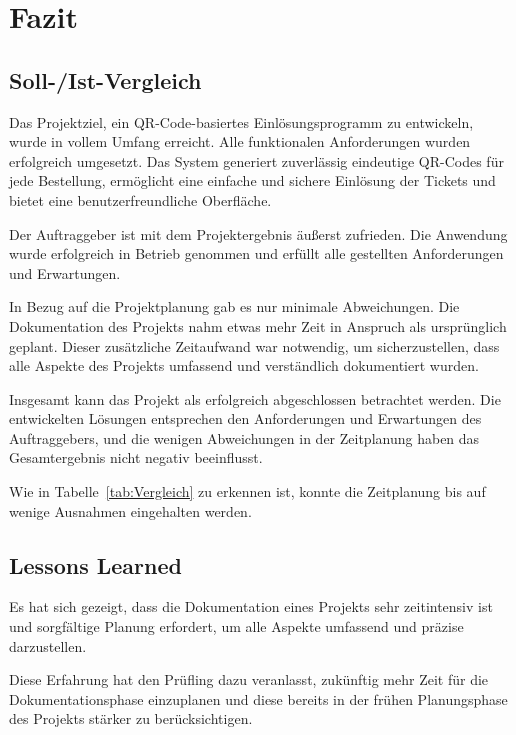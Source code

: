 \section{Fazit} 
\label{sec:Fazit}

\subsection{Soll-/Ist-Vergleich}
\label{sec:SollIstVergleich}

Das Projektziel, ein QR-Code-basiertes Einlösungsprogramm zu entwickeln, wurde in vollem Umfang erreicht. Alle funktionalen Anforderungen wurden erfolgreich umgesetzt. Das System generiert zuverlässig eindeutige QR-Codes für jede Bestellung, ermöglicht eine einfache und sichere Einlösung der Tickets und bietet eine benutzerfreundliche Oberfläche.

Der Auftraggeber ist mit dem Projektergebnis äußerst zufrieden. Die Anwendung wurde erfolgreich in Betrieb genommen und erfüllt alle gestellten Anforderungen und Erwartungen.

In Bezug auf die Projektplanung gab es nur minimale Abweichungen. Die Dokumentation des Projekts nahm etwas mehr Zeit in Anspruch als ursprünglich geplant. Dieser zusätzliche Zeitaufwand war notwendig, um sicherzustellen, dass alle Aspekte des Projekts umfassend und verständlich dokumentiert wurden.

Insgesamt kann das Projekt als erfolgreich abgeschlossen betrachtet werden. Die entwickelten Lösungen entsprechen den Anforderungen und Erwartungen des Auftraggebers, und die wenigen Abweichungen in der Zeitplanung haben das Gesamtergebnis nicht negativ beeinflusst.

Wie in Tabelle~\ref{tab:Vergleich} zu erkennen ist, konnte die Zeitplanung bis auf wenige Ausnahmen eingehalten werden.


\subsection{Lessons Learned}
\label{sec:LessonsLearned}

Es hat sich gezeigt, dass die Dokumentation eines Projekts sehr zeitintensiv ist und sorgfältige Planung erfordert, um alle Aspekte umfassend und präzise darzustellen. 

Diese Erfahrung hat den Prüfling dazu veranlasst, zukünftig mehr Zeit für die Dokumentationsphase einzuplanen und diese bereits in der frühen Planungsphase des Projekts stärker zu berücksichtigen.


